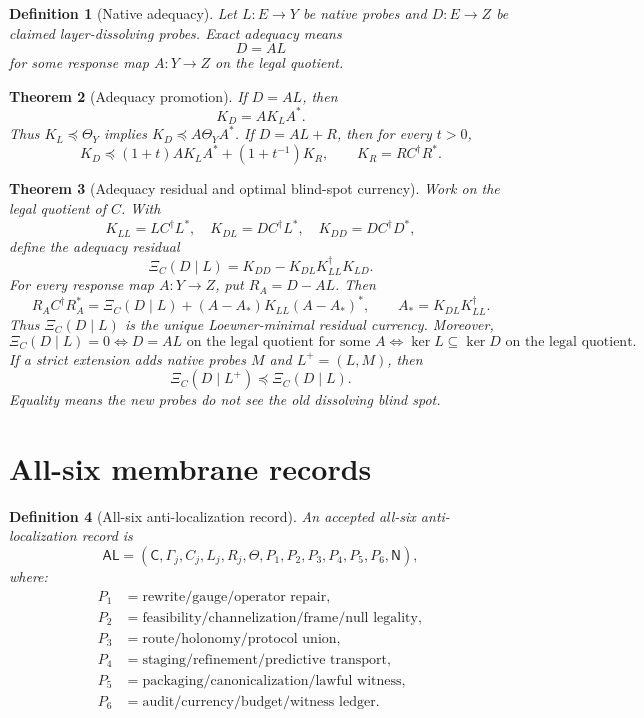 \documentclass[11pt]{article}
\newtheorem{theorem}{Theorem}[section]
\newtheorem{definition}[theorem]{Definition}
\newcommand{\AL}{\mathsf{AL}}
\begin{document}
\begin{definition}[Native adequacy]
Let \(L:E\to Y\) be native probes and \(D:E\to Z\) be claimed layer-dissolving probes.  Exact adequacy means
\[
  D=A L
\]
for some response map \(A:Y\to Z\) on the legal quotient.
\end{definition}

\begin{theorem}[Adequacy promotion]
If \(D=A L\), then
\[
  K_D=A K_L A^*.
\]
Thus \(K_L\preceq\Theta_Y\) implies \(K_D\preceq A\Theta_YA^*\).  If \(D=AL+R\), then for every \(t>0\),
\[
  K_D\preceq (1+t)A K_LA^*+(1+t^{-1})K_R,
  \qquad K_R=RC^\dagger R^*.
\]
\end{theorem}

\begin{theorem}[Adequacy residual and optimal blind-spot currency]
Work on the legal quotient of \(C\).  With
\[
  K_{LL}=LC^\dagger L^*,\quad K_{DL}=DC^\dagger L^*,\quad K_{DD}=DC^\dagger D^*,
\]
define the adequacy residual
\[
  \Xi_C(D\mid L)=K_{DD}-K_{DL}K_{LL}^\dagger K_{LD}.
\]
For every response map \(A:Y\to Z\), put \(R_A=D-AL\).  Then
\[
  R_AC^\dagger R_A^*
  =
  \Xi_C(D\mid L)+(A-A_*)K_{LL}(A-A_*)^*,
  \qquad
  A_*=K_{DL}K_{LL}^\dagger.
\]
Thus \(\Xi_C(D\mid L)\) is the unique Loewner-minimal residual currency.  Moreover,
\[
  \Xi_C(D\mid L)=0
  \Longleftrightarrow
  D=AL\text{ on the legal quotient for some }A
  \Longleftrightarrow
  \ker L\subseteq\ker D
  \text{ on the legal quotient.}
\]
If a strict extension adds native probes \(M\) and \(L^+=(L,M)\), then
\[
  \Xi_C(D\mid L^+)\preceq\Xi_C(D\mid L).
\]
Equality means the new probes do not see the old dissolving blind spot.
\end{theorem}

\section{All-six membrane records}

\begin{definition}[All-six anti-localization record]
An accepted all-six anti-localization record is
\[
\AL=(\mathsf C,\Gamma_j,C_j,L_j,R_j,\Theta,P_1,P_2,P_3,P_4,P_5,P_6,\mathsf N),
\]
where:
\begin{align*}
P_1&=\text{rewrite/gauge/operator repair},\\
P_2&=\text{feasibility/channelization/frame/null legality},\\
P_3&=\text{route/holonomy/protocol union},\\
P_4&=\text{staging/refinement/predictive transport},\\
P_5&=\text{packaging/canonicalization/lawful witness},\\
P_6&=\text{audit/currency/budget/witness ledger}.
\end{align*}
\end{definition}
\end{document}
